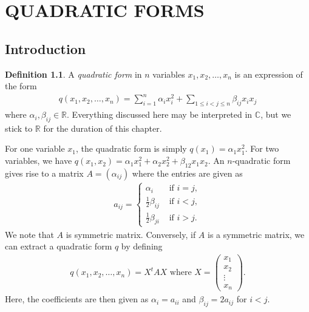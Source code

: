 \documentclass[15pt,a4paper]{book}
\theoremstyle{definition}
\newtheorem{definition}[theorem]{Definition}
\newcommand{\eax}[1]{\emph{#1}\index{#1}} %
\newcommand{\R}{\mathbb{R}}
\newcommand{\C}{\mathbb{C}}
\begin{document}
\chapter{QUADRATIC FORMS}


\section{Introduction}
\begin{definition}
    A \eax{quadratic form} in $n$ variables $x_{1},x_{2},\ldots,x_{n}$ is an expression of the form
    \begin{align*}
        q(x_{1},x_{2},\ldots,x_{n}) = \sum_{i=1}^{n} \alpha_{i}x_{i}^{2} + \sum_{1 \leq i < j \leq n} \beta_{ij}x_{i}x_{j}
    \end{align*}
    where $\alpha_{i},\beta_{ij} \in \R$. Everything discussed here may be interpreted in $\C$, but we stick to $\R$ for the duration of this chapter.
\end{definition}
For one variable $x_{1}$, the quadratic form is simply $q(x_{1}) = \alpha_{1}x_{1}^{2}$. For two variables, we have $q(x_{1},x_{2}) = \alpha_{1}x_{1}^{2} + \alpha_{2}x_{2}^{2} + \beta_{12}x_{1}x_{2}$. An $n$-quadratic form gives rise to a matrix $A = (\alpha_{ij})$ where the entries are given as
\begin{align}
    a_{ij} = \begin{cases}
        \alpha_{i} &\text{ if } i = j,\\
        \frac{1}{2} \beta_{ij} &\text{ if } i < j,\\
        \frac{1}{2} \beta_{ji} &\text{ if } i > j.
    \end{cases}
\end{align}
We note that $A$ is symmetric matrix. Conversely, if $A$ is a symmetric matrix, we can extract a quadratic form $q$ by defining
\begin{align}
    q(x_{1},x_{2},\ldots,x_{n}) = X^{t}AX \text{ where } X = \begin{pmatrix}
        x_{1} \\ x_{2} \\ \vdots \\ x_{n}
    \end{pmatrix}.
\end{align}
Here, the coefficients are then given as $\alpha_{i} = a_{ii}$ and $\beta_{ij} = 2a_{ij}$ for $i < j$.\\
\end{document}
